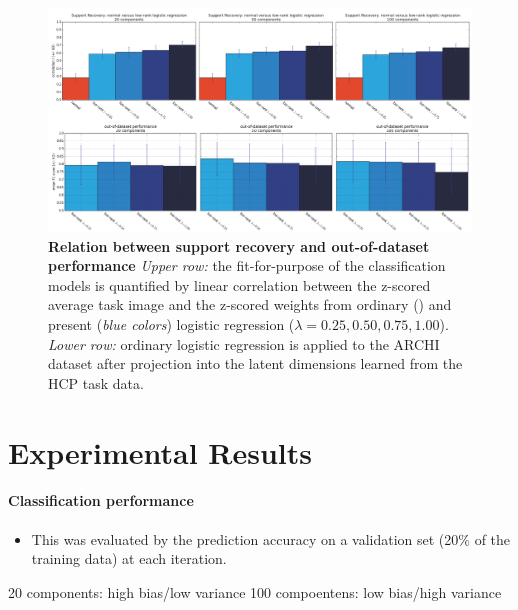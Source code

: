 \documentclass{article} %
\begin{document}
\begin{figure}
\begin{centering}
\includegraphics[width=1.00\textwidth]{figures/support_bars.png}
\end{centering}
\caption{\textbf{Relation between support recovery and out-of-dataset performance}
\textit{Upper row:} the fit-for-purpose of the classification models
is quantified by linear correlation between the
z-scored average task image and the z-scored weights from
ordinary () and present (\textit{blue colors}) logistic
regression ($\lambda=0.25, 0.50, 0.75, 1.00$).
\textit{Lower row:} ordinary logistic regression is applied to the
ARCHI dataset after projection into the latent dimensions learned from
the HCP task data.
}
\end{figure}


\bigskip

\section{Experimental Results}


\paragraph{Classification performance}
\begin{itemize}
  \item{This was evaluated by the prediction
accuracy on a validation set (20\% of the training data) at each iteration.}
\end{itemize}


20 components: high bias/low variance
100 compoentens: low bias/high variance
\end{document}
